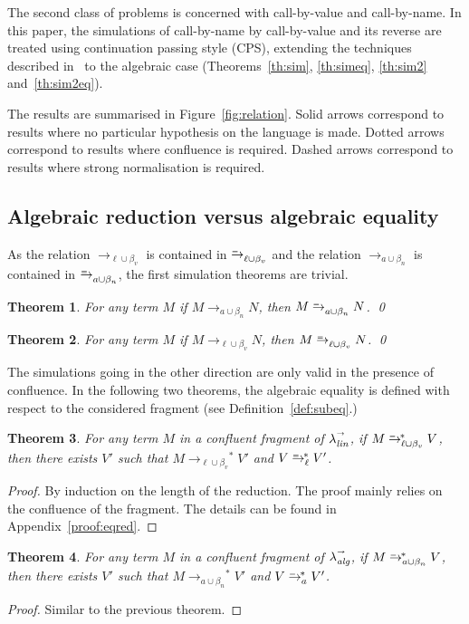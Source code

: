 \documentclass{LMCS}
\newtheorem{theorem}{Theorem}[section]
\newcommand{\App}[1]{The details can be found in Appendix~\ref{proof:#1}}
\newcommand{\xllin}[1]{\ensuremath{\lambda^{\raisebox{0.5ex}{\textrm{\tiny $#1$}}}_{{\it lin}}}}
\newcommand{\xlalg}[1]{\ensuremath{\lambda^{\raisebox{0.5ex}{\textrm{\tiny $#1$}}}_{{\it alg}}}}
\newcommand{\llinred}{\xllin{\rightarrow}}
\newcommand{\lalgred}{\xlalg{\rightarrow}}
\newcommand{\xto}[1]{\ensuremath{\rightarrow_{#1}}}
\newcommand{\simxto}[1]{\ensuremath{\rightarrow_{#1}^{\hspace{-2.2ex}\textrm{\tiny=}}}}
\newcommand{\ssimxto}[1]{\ensuremath{\rightarrow_{#1}^{\hspace{-2.2ex}\textrm{\tiny=}\ *}}}
\newcommand{\toblinred}{\xto{\ell\cup\beta_v}}
\newcommand{\tobalgred}{\xto{a\cup\beta_n}}
\newcommand{\toblineq}{\simxto{{\ell}\cup\beta_v}}
\newcommand{\tobalgeq}{\simxto{a\cup\beta_n}}
\newcommand{\stoblinred}{\ensuremath{\xto{\ell\cup\beta_v}^{\ast}}}
\newcommand{\stobalgred}{\ensuremath{\xto{a\cup\beta_n}^{\ast}}}
\newcommand{\stoblineq}{\ensuremath{\ssimxto{{\ell}\cup\beta_v}}}
\newcommand{\stobalgeq}{\ensuremath{\ssimxto{a\cup\beta_n}}}
\newcommand{\stolineq}{\ensuremath{\ssimxto{{\ell}}}}
\newcommand{\stoalgeq}{\ensuremath{\ssimxto{a}}}
\begin{document}
The second class of problems is concerned with call-by-value and
call-by-name. In this paper, the simulations of call-by-name by
call-by-value and its reverse are treated using continuation passing
style (CPS), extending the  techniques described
in~\cite{FischerSIGPLAN72,PlotkinTCS75} to the algebraic case
(Theorems~\ref{th:sim}, \ref{th:simeq}, \ref{th:sim2} and~\ref{th:sim2eq}).

The results are summarised in Figure~\ref{fig:relation}. Solid arrows
correspond to results where no particular hypothesis on the language
is made. Dotted arrows correspond to results where confluence is
required. Dashed arrows correspond to results where strong normalisation is required.

\subsection{Algebraic reduction versus algebraic equality}\label{sec:redeq}

As the relation $\toblinred$ is contained in $\toblineq$ and the
relation $\tobalgred$ is contained in $\tobalgeq$, the first
simulation theorems are trivial.

\begin{theorem}\label{th:redeq} For any term $M$ 
  if $M \tobalgred N$, then $M\tobalgeq N$.
  \qed
\end{theorem}

\begin{theorem}\label{th:redeq2} For any term $M$ 
  if $M \toblinred N$, then $M\toblineq N$. 
  \qed
\end{theorem}

The simulations going in the other direction are only valid in the
presence of confluence. In the following two theorems, the algebraic
equality is defined with respect to the considered fragment (see
Definition~\ref{def:subeq}.)  

\begin{theorem}\label{thm:eqred}
  For any term $M$ in a confluent fragment of $\llinred$, if $M\stoblineq V$, then there exists $V'$ such that $M\stoblinred V'$ and $V\stolineq V'$.
\end{theorem}
\begin{proof}
  By induction on the length of the reduction. The proof mainly relies
  on the confluence of the fragment. \App{eqred}.
\end{proof}

\begin{theorem}\label{thm:eqred2}
  For any term $M$ in a confluent fragment of $\lalgred$, if $M\stobalgeq V$, then there exists $V'$ such that $M\stobalgred V'$ and $V\stoalgeq V'$.
\end{theorem}
\begin{proof}
  Similar to the previous theorem.
\end{proof}
\end{document}

